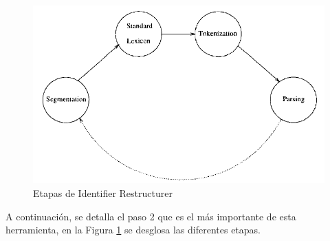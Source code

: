 \begin{figure}[h] %
\centering
\includegraphics[scale= 0.60]{./cap3/ire_2.png}
\caption{Etapas de Identifier Restructurer}
\label{ire2}
\end{figure}

A continuación, se detalla el paso 2 que es el más importante de esta herramienta, en la Figura \ref{ire2} se desglosa las diferentes etapas.

